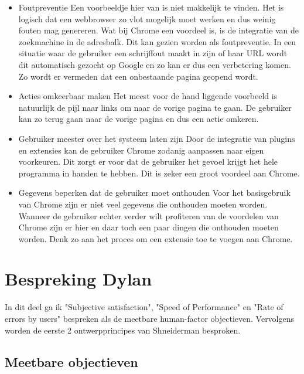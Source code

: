 \documentclass[12pt]{article}
\begin{document}
\begin{itemize}
\begin{figure}
  \label{fig:loading}
\end{figure}
\item Foutpreventie 
\newline
Een voorbeeldje hier van is niet makkelijk te vinden. Het is logisch dat een webbrowser zo vlot mogelijk moet werken en dus weinig fouten mag genereren. Wat bij Chrome een voordeel is, is de integratie van de zoekmachine in de adresbalk. Dit kan gezien worden als foutpreventie. In een situatie waar de gebruiker een schrijffout maakt in zijn of haar URL wordt dit automatisch gezocht op Google en zo kan er dus een verbetering komen. Zo wordt er vermeden dat een onbestaande pagina geopend wordt.
\item Acties omkeerbaar maken
\newline
Het meest voor de hand liggende voorbeeld is natuurlijk de pijl naar links om naar de vorige pagina te gaan. De gebruiker kan zo terug gaan naar de vorige pagina en dus een actie omkeren.
\item Gebruiker meester over het systeem laten zijn
\newline
Door de integratie van plugins en extensies kan de gebruiker Chrome zodanig aanpassen naar eigen voorkeuren. Dit zorgt er voor dat de gebruiker het gevoel krijgt het hele programma in handen te hebben. Dit is zeker een groot voordeel aan Chrome.
\item Gegevens beperken dat de gebruiker moet onthouden
\newline
Voor het basisgebruik van Chrome zijn er niet veel gegevens die onthouden moeten worden. Wanneer de gebruiker echter verder wilt profiteren van de voordelen van Chrome zijn er hier en daar toch een paar dingen die onthouden moeten worden. Denk zo aan het proces om een extensie toe te voegen aan Chrome.
\end{itemize}
\newpage

\section{Bespreking Dylan}
In dit deel ga ik "Subjective satisfaction", "Speed of Performance" en "Rate of errors by users" bespreken als de meetbare human-factor objectieven. Vervolgens worden de eerste 2 ontwerpprincipes van Shneiderman besproken.
\subsection{Meetbare objectieven}
\end{document}
